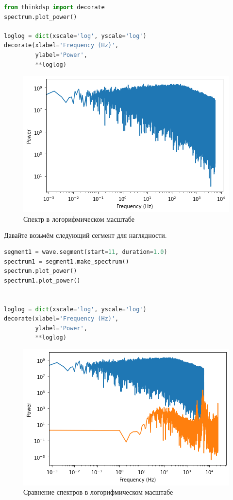 \begin{lstlisting}[language=Python]
from thinkdsp import decorate
spectrum.plot_power()

loglog = dict(xscale='log', yscale='log')
decorate(xlabel='Frequency (Hz)',
         ylabel='Power', 
         **loglog)
\end{lstlisting}
\begin{figure}[H]
	\begin{center}
		\includegraphics[scale=1]{fig/lab04/lab04_9_0.png}
		\caption{Спектр в логорифмическом масштабе}
	\end{center}
\end{figure}

Давайте возьмём следующий сегмент для наглядности.

\begin{lstlisting}[language=Python]
segment1 = wave.segment(start=11, duration=1.0)
spectrum1 = segment1.make_spectrum()
spectrum.plot_power()
spectrum1.plot_power()


loglog = dict(xscale='log', yscale='log')
decorate(xlabel='Frequency (Hz)',
         ylabel='Power', 
         **loglog)
\end{lstlisting}
\begin{figure}[H]
	\begin{center}
		\includegraphics[scale=1]{fig/lab04/lab04_12_0.png}
		\caption{Сравнение спектров в логорифмическом масштабе}
	\end{center}
\end{figure}


